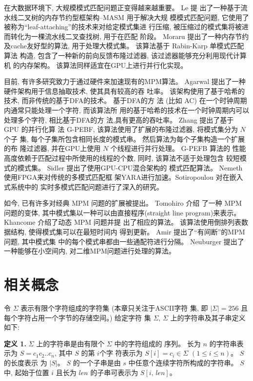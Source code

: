 在大数据环境下, 大规模模式匹配问题正变得越来越重要。 Le \cite{Le2013}提
出了一种基于流水线二叉树的内存节约型框架构--\textsf{MASM} 用于解决大规
模模式匹配问题, 它使用了被称为“leaf-attaching”的技术来对给定模式集进
行压缩, 被压缩过的模式集将被进而转化为一棵流水线二叉查找树, 用于在匹配
阶段。 Moraru \cite{Moraru2012} 提出了一种内存节约及cache友好型的算法,
用于处理大模式集。 该算法基于 Rabin-Karp \cite{Karp1987} 单模式匹配算法
构造, 包含了一种新的前向反馈布隆过滤器, 该过滤器能够充分利用现代计算机
的内存架构。 该算法同样适宜在GPU上进行并行化实现。

目前, 有许多研究致力于通过硬件来加速现有的MPM算法。 Agarwal
\cite{Agarwal2013} 提出了一种硬件架构用于信息抽取技术, 使其具有较高的吞
吐率。 该架构使用了基于哈希的技术, 而非传统的基于DFA的技术。 基于DFA的方
法 (比如 \textsf{AC}) 在一个时钟周期内通常只能处理一个字符, 而该算法所
用的基于哈希的技术在一个时钟周期内可以处理多个字符, 相比基于DFA的方
法,具有更高的吞吐率。 Zhang \cite{Zhang2015} 提出了基于 GPU 的并行化算
法 \textsf{G-PEBF}, 该算法使用了扩展的布隆过滤器, 将模式集分为 $N$ 个子
集, 每个子集所包含相同长度的模式串。 然后算法为每个子集构造一个扩展的布
隆过滤器, 并在GPU上使用 $N$ 个线程进行并行处理。 \textsf{G-PEFB} 算法的
性能高度依赖于匹配过程中所使用的线程的个数, 同时, 该算法不适于处理包含
较短模式的模式集。 Sidler \cite{Sidler2017} 提出了使用GPU-CPU混合架构的
模式匹配算法。 Nemeth \cite{Nemeth2016} 使用FPGA来对传统的多模式匹配框
架YARA进行加速。Sotiropoulou \cite{Sotiropoulou2017} 对在嵌入式系统中的
实时多模式匹配问题进行了深入的研究。

如今, 已有许多对经典 MPM 问题的扩展被提出。 Tomohiro \cite{I2015} 介绍
了一种 MPM 问题的变体, 其中模式集以一种可以由直接程序(straight line
program)来表示。  Khancome \cite{Khancome2013} 介绍了动态 MPM 问题并提
出了相应的算法。 该算法使用倒排列表数据结构, 使得模式集可以在最短时间内
得到更新。 Amir \cite{Amir2015} 提出了“有间断”的MPM 问题, 其中模式集
中的每个模式串都由一些通配符进行分隔。 Neuburger \cite{Neuburger2012}
提出了一种能够在小空间内, 对二维MPM问题进行处理的算法。

\section{相关概念}
\label{sec:2_notations}

令 $\Sigma$ 表示有限个字符组成的字符集 (本章只关注于ASCII字符
集, 即 $|\Sigma| = 256$ 且每个字符占用一个字节的存储空间。)  给定字符
集 $\Sigma$, $\Sigma$ 上的字符串及其子串定义如下:

\textbf{定义 1.}  $\Sigma$ 上的字符串是由有限个 $\Sigma$ 中的字符组成的
序列。 长为 $n$ 的字符串表示为 $S = c_1c_2..c_n$, 其中 $S$ 的第 $i$个字
符表示为 $S[i] = c_i \in \Sigma$ $(1 \leq i \leq n)$。  $S$ 的长度表示
为 $|S|$。 $S$ 的一个子串是由 $s$ 中任意个连续字符所构成的字符串。  $S$中,
起始于位置 $i$ 且长为 $len$ 的子串可表示为 $S[i,\,len]$。

